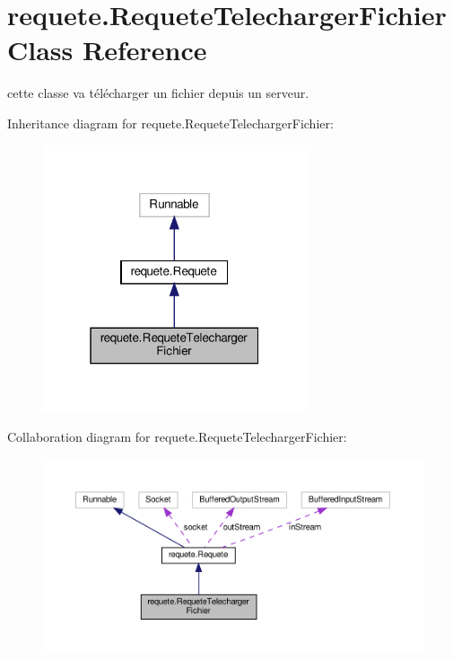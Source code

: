 \hypertarget{classrequete_1_1RequeteTelechargerFichier}{}\section{requete.\+Requete\+Telecharger\+Fichier Class Reference}
\label{classrequete_1_1RequeteTelechargerFichier}


cette classe va télécharger un fichier depuis un serveur.  




Inheritance diagram for requete.\+Requete\+Telecharger\+Fichier\+:\nopagebreak
\begin{figure}[H]
\begin{center}
\leavevmode
\includegraphics[width=220pt]{classrequete_1_1RequeteTelechargerFichier__inherit__graph}
\end{center}
\end{figure}


Collaboration diagram for requete.\+Requete\+Telecharger\+Fichier\+:\nopagebreak
\begin{figure}[H]
\begin{center}
\leavevmode
\includegraphics[width=350pt]{classrequete_1_1RequeteTelechargerFichier__coll__graph}
\end{center}
\end{figure}
